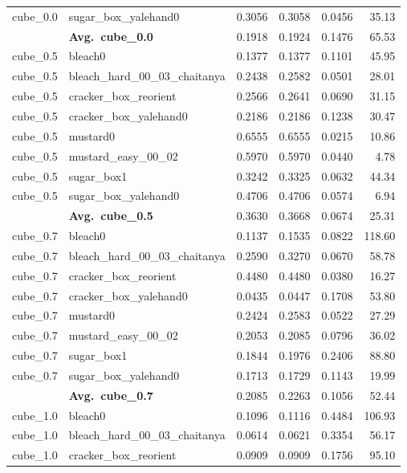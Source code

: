 \begin{longtable}{llrrrr}
  cube_0.0 & sugar\_box\_yalehand0 & 0.3056 & 0.3058 & 0.0456 & 35.13 \\
  \cmidrule{2-6}
  & \textbf{Avg.~cube_0.0} & 0.1918 & 0.1924 & 0.1476 & 65.53 \\
  \midrule
  cube_0.5 & bleach0 & 0.1377 & 0.1377 & 0.1101 & 45.95 \\
  cube_0.5 & bleach\_hard\_00\_03\_chaitanya & 0.2438 & 0.2582 & 0.0501 & 28.01 \\
  cube_0.5 & cracker\_box\_reorient & 0.2566 & 0.2641 & 0.0690 & 31.15 \\
  cube_0.5 & cracker\_box\_yalehand0 & 0.2186 & 0.2186 & 0.1238 & 30.47 \\
  cube_0.5 & mustard0 & 0.6555 & 0.6555 & 0.0215 & 10.86 \\
  cube_0.5 & mustard\_easy\_00\_02 & 0.5970 & 0.5970 & 0.0440 & 4.78 \\
  cube_0.5 & sugar\_box1 & 0.3242 & 0.3325 & 0.0632 & 44.34 \\
  cube_0.5 & sugar\_box\_yalehand0 & 0.4706 & 0.4706 & 0.0574 & 6.94 \\
  \cmidrule{2-6}
  & \textbf{Avg.~cube_0.5} & 0.3630 & 0.3668 & 0.0674 & 25.31 \\
  \midrule
  cube_0.7 & bleach0 & 0.1137 & 0.1535 & 0.0822 & 118.60 \\
  cube_0.7 & bleach\_hard\_00\_03\_chaitanya & 0.2590 & 0.3270 & 0.0670 & 58.78 \\
  cube_0.7 & cracker\_box\_reorient & 0.4480 & 0.4480 & 0.0380 & 16.27 \\
  cube_0.7 & cracker\_box\_yalehand0 & 0.0435 & 0.0447 & 0.1708 & 53.80 \\
  cube_0.7 & mustard0 & 0.2424 & 0.2583 & 0.0522 & 27.29 \\
  cube_0.7 & mustard\_easy\_00\_02 & 0.2053 & 0.2085 & 0.0796 & 36.02 \\
  cube_0.7 & sugar\_box1 & 0.1844 & 0.1976 & 0.2406 & 88.80 \\
  cube_0.7 & sugar\_box\_yalehand0 & 0.1713 & 0.1729 & 0.1143 & 19.99 \\
  \cmidrule{2-6}
  & \textbf{Avg.~cube_0.7} & 0.2085 & 0.2263 & 0.1056 & 52.44 \\
  \midrule
  cube_1.0 & bleach0 & 0.1096 & 0.1116 & 0.4484 & 106.93 \\
  cube_1.0 & bleach\_hard\_00\_03\_chaitanya & 0.0614 & 0.0621 & 0.3354 & 56.17 \\
  cube_1.0 & cracker\_box\_reorient & 0.0909 & 0.0909 & 0.1756 & 95.10 \\

\end{longtable}
